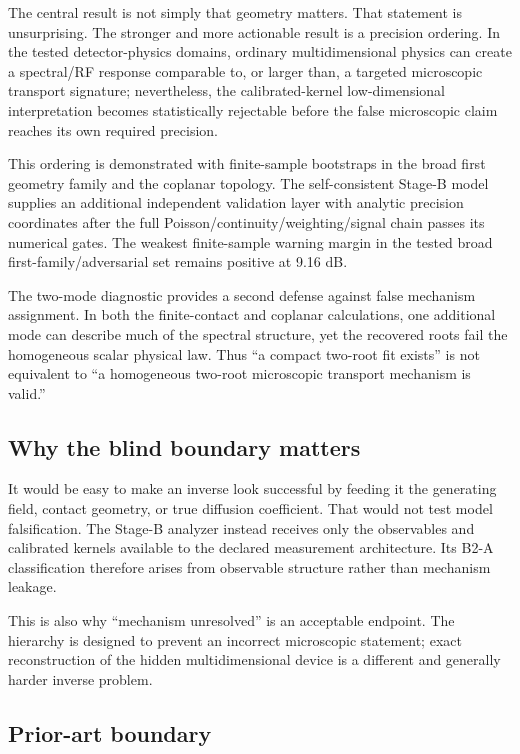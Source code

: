 \documentclass[11pt]{article}
\begin{document}
The central result is not simply that geometry matters. That statement is unsurprising. The stronger and more actionable result is a precision ordering. In the tested detector-physics domains, ordinary multidimensional physics can create a spectral/RF response comparable to, or larger than, a targeted microscopic transport signature; nevertheless, the calibrated-kernel low-dimensional interpretation becomes statistically rejectable before the false microscopic claim reaches its own required precision.

This ordering is demonstrated with finite-sample bootstraps in the broad first geometry family and the coplanar topology. The self-consistent Stage-B model supplies an additional independent validation layer with analytic precision coordinates after the full Poisson/continuity/weighting/signal chain passes its numerical gates. The weakest finite-sample warning margin in the tested broad first-family/adversarial set remains positive at 9.16 dB.

The two-mode diagnostic provides a second defense against false mechanism assignment. In both the finite-contact and coplanar calculations, one additional mode can describe much of the spectral structure, yet the recovered roots fail the homogeneous scalar physical law. Thus ``a compact two-root fit exists'' is not equivalent to ``a homogeneous two-root microscopic transport mechanism is valid.''

\subsection{Why the blind boundary matters}

It would be easy to make an inverse look successful by feeding it the generating field, contact geometry, or true diffusion coefficient. That would not test model falsification. The Stage-B analyzer instead receives only the observables and calibrated kernels available to the declared measurement architecture. Its B2-A classification therefore arises from observable structure rather than mechanism leakage.

This is also why ``mechanism unresolved'' is an acceptable endpoint. The hierarchy is designed to prevent an incorrect microscopic statement; exact reconstruction of the hidden multidimensional device is a different and generally harder inverse problem.

\subsection{Prior-art boundary}
\end{document}

